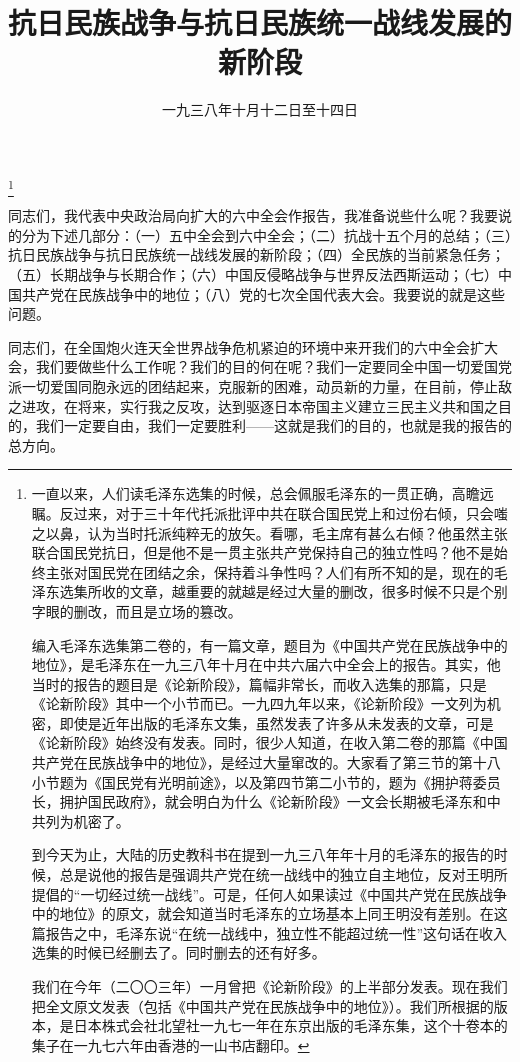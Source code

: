 
\title{抗日民族战争与抗日民族统一战线发展的新阶段}
\date{一九三八年十月十二日至十四日}
\thanks{一直以来，人们读毛泽东选集的时候，总会佩服毛泽东的一贯正确，高瞻远瞩。反过来，对于三十年代托派批评中共在联合国民党上和过份右倾，只会嗤之以鼻，认为当时托派纯粹无的放矢。看哪，毛主席有甚么右倾？他虽然主张联合国民党抗日，但是他不是一贯主张共产党保持自己的独立性吗？他不是始终主张对国民党在团结之余，保持着斗争性吗？人们有所不知的是，现在的毛泽东选集所收的文章，越重要的就越是经过大量的删改，很多时候不只是个别字眼的删改，而且是立场的篡改。

编入毛泽东选集第二卷的，有一篇文章，题目为《中国共产党在民族战争中的地位》，是毛泽东在一九三八年十月在中共六届六中全会上的报告。其实，他当时的报告的题目是《论新阶段》，篇幅非常长，而收入选集的那篇，只是《论新阶段》其中一个小节而已。一九四九年以来，《论新阶段》一文列为机密，即使是近年出版的毛泽东文集，虽然发表了许多从未发表的文章，可是《论新阶段》始终没有发表。同时，很少人知道，在收入第二卷的那篇《中国共产党在民族战争中的地位》，是经过大量窜改的。大家看了第三节的第十八小节题为《国民党有光明前途》，以及第四节第二小节的，题为《拥护蒋委员长，拥护国民政府》，就会明白为什么《论新阶段》一文会长期被毛泽东和中共列为机密了。

到今天为止，大陆的历史教科书在提到一九三八年年十月的毛泽东的报告的时候，总是说他的报告是强调共产党在统一战线中的独立自主地位，反对王明所提倡的“一切经过统一战线”。可是，任何人如果读过《中国共产党在民族战争中的地位》的原文，就会知道当时毛泽东的立场基本上同王明没有差别。在这篇报告之中，毛泽东说“在统一战线中，独立性不能超过统一性”这句话在收入选集的时候已经删去了。同时删去的还有好多。

我们在今年（二〇〇三年）一月曾把《论新阶段》的上半部分发表。现在我们把全文原文发表（包括《中国共产党在民族战争中的地位》）。我们所根据的版本，是日本株式会社北望社一九七一年在东京出版的毛泽东集，这个十卷本的集子在一九七六年由香港的一山书店翻印。}
\maketitle



同志们，我代表中央政治局向扩大的六中全会作报告，我准备说些什么呢？我要说的分为下述几部分：（一）五中全会到六中全会；（二）抗战十五个月的总结；（三）抗日民族战争与抗日民族统一战线发展的新阶段；（四）全民族的当前紧急任务；（五）长期战争与长期合作；（六）中国反侵略战争与世界反法西斯运动；（七）中国共产党在民族战争中的地位；（八）党的七次全国代表大会。我要说的就是这些问题。

同志们，在全国炮火连天全世界战争危机紧迫的环境中来开我们的六中全会扩大会，我们要做些什么工作呢？我们的目的何在呢？我们一定要同全中国一切爱国党派一切爱国同胞永远的团结起来，克服新的困难，动员新的力量，在目前，停止敌之进攻，在将来，实行我之反攻，达到驱逐日本帝国主义建立三民主义共和国之目的，我们一定要自由，我们一定要胜利——这就是我们的目的，也就是我的报告的总方向。


